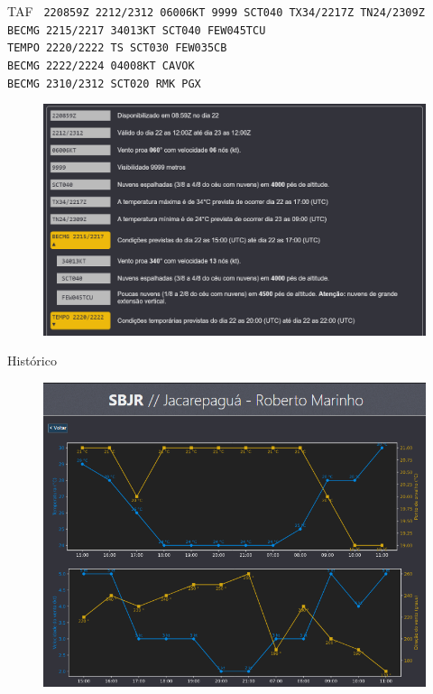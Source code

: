 \documentclass{beamer}
\begin{document}
\begin{frame}{TAF}
    \footnotesize{\texttt{
220859Z 2212/2312 06006KT 9999 SCT040 TX34/2217Z TN24/2309Z \\
    BECMG 2215/2217 34013KT SCT040 FEW045TCU \\
    TEMPO 2220/2222 TS SCT030 FEW035CB \\
    BECMG 2222/2224 04008KT CAVOK \\
    BECMG 2310/2312 SCT020 RMK PGX}}

  \begin{figure}[ht]
    \begin{center}
    \includegraphics[width=0.7\linewidth]{img/TAF-SBBE.png}
    \label{fig:UI}
    \end{center}
    \end{figure}
\end{frame}

\begin{frame}{Histórico}
    \begin{figure}[ht]
        \begin{center}
        \includegraphics[width=0.9\linewidth]{img/history-1.png}
        \label{fig:UI}
        \end{center}
    \end{figure}
\end{frame}
\end{document}
